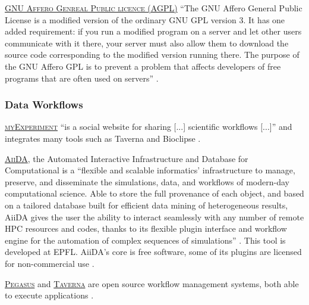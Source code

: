 \vspace{0.4cm}

\noindent {} \textsc{\href{http://www.gnu.org/licenses/agpl.html}{GNU Affero Genreal Public licence (AGPL)}} ``The GNU Affero General Public License is a modified version of the ordinary GNU GPL version 3. It has one added requirement: if you run a modified program on a server and let other users communicate with it there, your server must also allow them to download the source code corresponding to the modified version running there. The purpose of the GNU Affero GPL is to prevent a problem that affects developers of free programs that are often used on servers'' \cite{fsf_agpl_2015}.

\subsubsection{Data Workflows}
\label{data_workflows}

\noindent {} \textsc{\href{http://www.myexperiment.org}{myExperiment}} ``is a social website for sharing [...] scientific workflows [...]'' and integrates many tools such as Taverna and Bioclipse \cite{myexperiment_myexperiment_2014,myexperiment.org_myexperiment_2015}.

\vspace{0.4cm}

\noindent {}  \textsc{\href{http://www.aiida.net/}{AiiDA}}, the Automated Interactive Infrastructure and Database for Computational is a ``flexible and scalable informatics' infrastructure to manage, preserve, and disseminate the simulations, data, and workflows of modern-day computational science. Able to store the full provenance of each object, and based on a tailored database built for efficient data mining of heterogeneous results, AiiDA gives the user the ability to interact seamlessly with any number of remote HPC resources and codes, thanks to its flexible plugin interface and workflow engine for the automation of complex sequences of simulations'' \cite{aiida.net_aiida_2015}. This tool is developed at EPFL. AiiDA's core is free software, some of its plugins are licensed for non-commercial use \cite{pizzi_aiida:_2015}.

\vspace{0.4cm}

\noindent {}  \textsc{\href{http://pegasus.isi.edu/}{Pegasus}} and \textsc{\href{http://www.taverna.org.uk/}{Taverna}} are open source workflow management systems, both able to execute applications \cite{pegasus_pegasus_2015,taverna_taverna_2015}.

